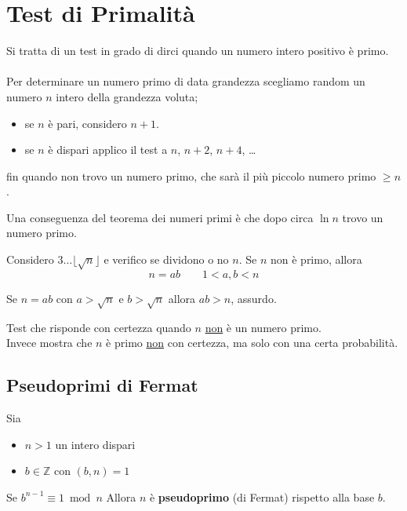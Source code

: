 \documentclass[a4paper,12pt, oneside]{book}
\begin{document}
\section{Test di Primalità}
Si tratta di un test in grado di dirci quando un numero intero positivo è primo.\\\\
Per determinare un numero primo di data grandezza scegliamo random un numero $n$ intero della grandezza voluta;
\begin{itemize}
	\item se $n$ è pari, considero $n+1$.
	\item se $n$ è dispari applico il test a $n$, $n+2$, $n+4$, \dots
\end{itemize}
fin quando non trovo un numero primo, che sarà il più piccolo numero primo $\geq n$.\\

\begin{osservazione}
	Una conseguenza del teorema dei numeri primi è che dopo circa $\ln n$ trovo un numero primo.
\end{osservazione}

\begin{definizione}
	Considero $3 \dots \lfloor \sqrt{n} \rfloor$
	e verifico se dividono o no $n$.
	Se $n$ non è primo, allora
	$$n = ab \qquad 1 < a,b < n $$
\end{definizione}
\begin{nota}
	Se $n = ab$ con $a>\sqrt{n}$ e $b>\sqrt{n}$ allora $ab>n$, assurdo.
\end{nota}

\begin{definizione}
	Test che risponde con certezza quando $n$ \underline{non} è un numero primo. \\
	Invece mostra che $n$ è primo \underline{non} con certezza, ma solo con una certa probabilità.
\end{definizione}

\subsection{Pseudoprimi di Fermat}

\begin{definizione}
	Sia \begin{itemize}
		\item $n>1$ un intero dispari
		\item $b \in \mathbb{Z}$ con $(b,n)=1$
	\end{itemize}
	Se $b^{n-1} \equiv 1 \bmod n$
	Allora $n$ è \textbf{pseudoprimo} (di Fermat) rispetto alla base $b$.
\end{definizione}
\end{document}
